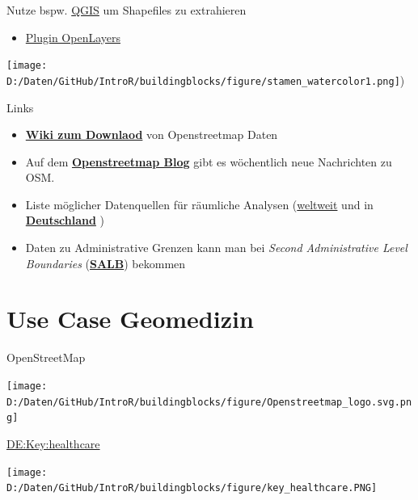 \documentclass[ignorenonframetext,]{beamer}
\providecommand{\tightlist}{%
  \setlength{\itemsep}{0pt}\setlength{\parskip}{0pt}}
\begin{document}
\begin{frame}{Nutze bspw. \href{http://www.qgis.org/de/site/}{QGIS} um
Shapefiles zu extrahieren}

\begin{itemize}
\tightlist
\item
  \href{http://www.qgistutorials.com/de/docs/downloading_osm_data.html}{Plugin
  OpenLayers}
\end{itemize}

\texttt{[image: D:/Daten/GitHub/IntroR/buildingblocks/figure/stamen\_watercolor1.png]})

\end{frame}

\begin{frame}{Links}

\begin{itemize}
\item
  \href{http://wiki.openstreetmap.org/wiki/Downloading_data}{\textbf{Wiki
  zum Downlaod}} von Openstreetmap Daten
\item
  Auf dem \href{http://blog.openstreetmap.de/}{\textbf{Openstreetmap
  Blog}} gibt es wöchentlich neue Nachrichten zu OSM.
\item
  Liste möglicher Datenquellen für räumliche Analysen
  (\href{http://wiki.openstreetmap.org/wiki/Potential_Datasources}{weltweit}
  und in
  \href{http://wiki.openstreetmap.org/wiki/DE:Potential_Datasources}{\textbf{Deutschland}}
  )
\item
  Daten zu Administrative Grenzen kann man bei \emph{Second
  Administrative Level Boundaries}
  (\href{http://wiki.openstreetmap.org/wiki/SALB}{\textbf{SALB}})
  bekommen
\end{itemize}

\end{frame}

\section{Use Case Geomedizin}\label{use-case-geomedizin}

\begin{frame}{OpenStreetMap}

\texttt{[image: D:/Daten/GitHub/IntroR/buildingblocks/figure/Openstreetmap\_logo.svg.png]}

\end{frame}

\begin{frame}{\href{https://wiki.openstreetmap.org/wiki/DE:Key:healthcare}{DE:Key:healthcare}}

\texttt{[image: D:/Daten/GitHub/IntroR/buildingblocks/figure/key\_healthcare.PNG]}

\end{frame}
\end{document}
